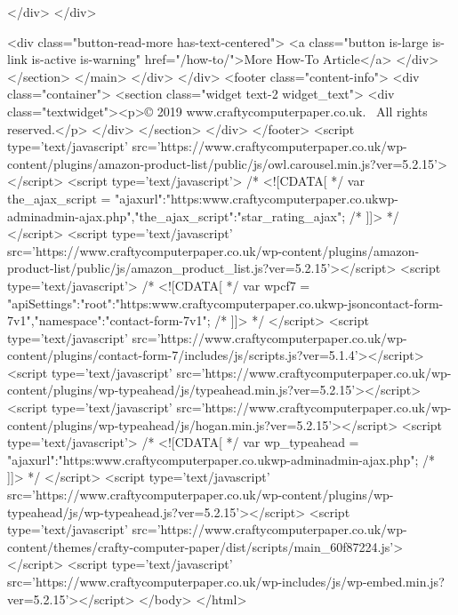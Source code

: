     </div>
  </div>

  <div class="button-read-more has-text-centered">
    <a class="button is-large is-link is-active is-warning" href="/how-to/">More How-To Article</a>
  </div>
</section>
          </main>
              </div>
    </div>
        <footer class="content-info">
  <div class="container">
    <section class="widget text-2 widget_text">			<div class="textwidget"><p>© 2019 www.craftycomputerpaper.co.uk.  All rights reserved.</p>
</div>
		</section>  </div>
</footer>
    <script type='text/javascript' src='https://www.craftycomputerpaper.co.uk/wp-content/plugins/amazon-product-list/public/js/owl.carousel.min.js?ver=5.2.15'></script>
<script type='text/javascript'>
/* <![CDATA[ */
var the_ajax_script = {"ajaxurl":"https:\/\/www.craftycomputerpaper.co.uk\/wp-admin\/admin-ajax.php","the_ajax_script":"star_rating_ajax"};
/* ]]> */
</script>
<script type='text/javascript' src='https://www.craftycomputerpaper.co.uk/wp-content/plugins/amazon-product-list/public/js/amazon_product_list.js?ver=5.2.15'></script>
<script type='text/javascript'>
/* <![CDATA[ */
var wpcf7 = {"apiSettings":{"root":"https:\/\/www.craftycomputerpaper.co.uk\/wp-json\/contact-form-7\/v1","namespace":"contact-form-7\/v1"}};
/* ]]> */
</script>
<script type='text/javascript' src='https://www.craftycomputerpaper.co.uk/wp-content/plugins/contact-form-7/includes/js/scripts.js?ver=5.1.4'></script>
<script type='text/javascript' src='https://www.craftycomputerpaper.co.uk/wp-content/plugins/wp-typeahead/js/typeahead.min.js?ver=5.2.15'></script>
<script type='text/javascript' src='https://www.craftycomputerpaper.co.uk/wp-content/plugins/wp-typeahead/js/hogan.min.js?ver=5.2.15'></script>
<script type='text/javascript'>
/* <![CDATA[ */
var wp_typeahead = {"ajaxurl":"https:\/\/www.craftycomputerpaper.co.uk\/wp-admin\/admin-ajax.php"};
/* ]]> */
</script>
<script type='text/javascript' src='https://www.craftycomputerpaper.co.uk/wp-content/plugins/wp-typeahead/js/wp-typeahead.js?ver=5.2.15'></script>
<script type='text/javascript' src='https://www.craftycomputerpaper.co.uk/wp-content/themes/crafty-computer-paper/dist/scripts/main_60f87224.js'></script>
<script type='text/javascript' src='https://www.craftycomputerpaper.co.uk/wp-includes/js/wp-embed.min.js?ver=5.2.15'></script>
  </body>
</html>

